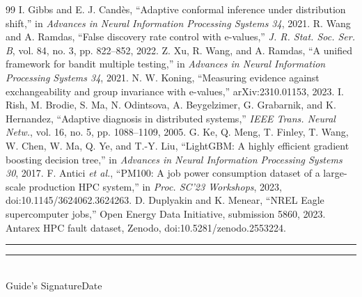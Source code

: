 \documentclass[10pt,a4paper]{article}
\begin{document}
\begin{thebibliography}{99}
 I. Gibbs and E. J. Cand\`es, ``Adaptive conformal inference under distribution shift,'' in \emph{Advances in Neural Information Processing Systems 34}, 2021.
 R. Wang and A. Ramdas, ``False discovery rate control with e-values,'' \emph{J. R. Stat. Soc. Ser. B}, vol. 84, no. 3, pp. 822--852, 2022.
 Z. Xu, R. Wang, and A. Ramdas, ``A unified framework for bandit multiple testing,'' in \emph{Advances in Neural Information Processing Systems 34}, 2021.
 N. W. Koning, ``Measuring evidence against exchangeability and group invariance with e-values,'' arXiv:2310.01153, 2023.
 I. Rish, M. Brodie, S. Ma, N. Odintsova, A. Beygelzimer, G. Grabarnik, and K. Hernandez, ``Adaptive diagnosis in distributed systems,'' \emph{IEEE Trans. Neural Netw.}, vol. 16, no. 5, pp. 1088--1109, 2005.
 G. Ke, Q. Meng, T. Finley, T. Wang, W. Chen, W. Ma, Q. Ye, and T.-Y. Liu, ``LightGBM: A highly efficient gradient boosting decision tree,'' in \emph{Advances in Neural Information Processing Systems 30}, 2017.
 F. Antici \emph{et al.}, ``PM100: A job power consumption dataset of a large-scale production HPC system,'' in \emph{Proc. SC'23 Workshops}, 2023, doi:10.1145/3624062.3624263.
 D. Duplyakin and K. Menear, ``NREL Eagle supercomputer jobs,'' Open Energy Data Initiative, submission 5860, 2023.
 Antarex HPC fault dataset, Zenodo, doi:10.5281/zenodo.2553224.
\end{thebibliography}

\vspace{1.5cm}
\noindent\rule{4.5cm}{0.4pt}\hfill\rule{4.5cm}{0.4pt}\\
Guide's Signature\hfill Date
\end{document}
